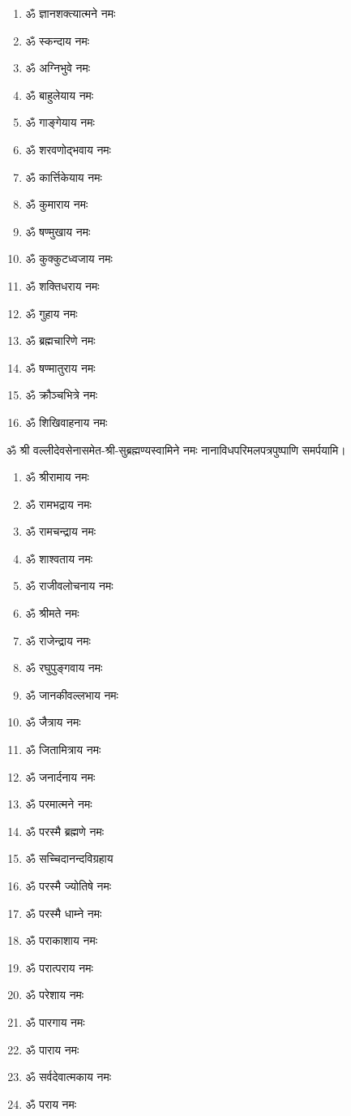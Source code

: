 \begin{center}
\vspace{-1em}
\begin{multicols}{2}
\begin{enumerate}
\item ॐ ज्ञानशक्त्यात्मने नमः
\item ॐ स्कन्दाय नमः
\item ॐ अग्निभुवे नमः
\item ॐ बाहुलेयाय नमः
\item ॐ गाङ्गेयाय नमः
\item ॐ शरवणोद्भवाय नमः
\item ॐ कार्त्तिकेयाय नमः
\item ॐ कुमाराय नमः
\item ॐ षण्मुखाय नमः
\item ॐ कुक्कुटध्वजाय नमः
\item ॐ शक्तिधराय नमः
\item ॐ गुहाय नमः
\item ॐ ब्रह्मचारिणे नमः
\item ॐ षण्मातुराय नमः
\item ॐ क्रौञ्चभित्रे नमः
\item ॐ शिखिवाहनाय नमः
\end{enumerate}
\end{multicols}
\vspace{-1em}
ॐ श्री वल्लीदेवसेनासमेत-श्री-सुब्रह्मण्यस्वामिने नमः नानाविधपरिमलपत्रपुष्पाणि समर्पयामि। \medskip


\begin{multicols}{2}
\begin{enumerate}
\item ॐ श्रीरामाय नमः
\item ॐ रामभद्राय नमः
\item ॐ रामचन्द्राय नमः
\item ॐ शाश्वताय नमः
\item ॐ राजीवलोचनाय नमः
\item ॐ श्रीमते नमः
\item ॐ राजेन्द्राय नमः
\item ॐ रघुपुङ्गवाय नमः
\item ॐ जानकीवल्लभाय नमः
\item ॐ जैत्राय नमः
\item ॐ जितामित्राय नमः
\item ॐ जनार्दनाय नमः
\item ॐ परमात्मने नमः
\item ॐ परस्मै ब्रह्मणे नमः
\item ॐ सच्चिदानन्दविग्रहाय
\item ॐ परस्मै ज्योतिषे नमः
\item ॐ परस्मै धाम्ने नमः
\item ॐ पराकाशाय नमः
\item ॐ परात्पराय नमः
\item ॐ परेशाय नमः
\item ॐ पारगाय नमः
\item ॐ पाराय नमः
\item ॐ सर्वदेवात्मकाय नमः
\item ॐ पराय नमः
\end{enumerate}
\end{multicols}


\end{center}
